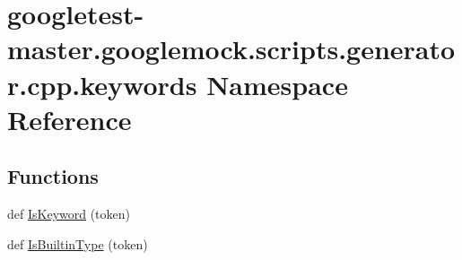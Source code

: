 \hypertarget{namespacegoogletest-master_1_1googlemock_1_1scripts_1_1generator_1_1cpp_1_1keywords}{}\section{googletest-\/master.googlemock.\+scripts.\+generator.\+cpp.\+keywords Namespace Reference}
\label{namespacegoogletest-master_1_1googlemock_1_1scripts_1_1generator_1_1cpp_1_1keywords}
\subsection*{Functions}
\begin{DoxyCompactItemize}
\item 
def \mbox{\hyperlink{namespacegoogletest-master_1_1googlemock_1_1scripts_1_1generator_1_1cpp_1_1keywords_ae39caec181b04df21d40b49b7ee0d958}{Is\+Keyword}} (token)
\item 
def \mbox{\hyperlink{namespacegoogletest-master_1_1googlemock_1_1scripts_1_1generator_1_1cpp_1_1keywords_a867188e9559a17bf6004fa94c7b5a27e}{Is\+Builtin\+Type}} (token)
\end{DoxyCompactItemize}
